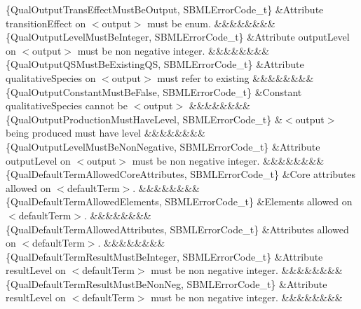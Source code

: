 \begin{DoxyParagraph}{}
\begin{longtabu}
\{Qual\+Output\+Trans\+Effect\+Must\+Be\+Output, S\+B\+M\+L\+Error\+Code\+\_\+t\} &Attribute \textquotesingle{}transition\+Effect\textquotesingle{} on {\ttfamily $<$output$>$} must be enum. &&&&&&&&\\
\{Qual\+Output\+Level\+Must\+Be\+Integer, S\+B\+M\+L\+Error\+Code\+\_\+t\} &Attribute \textquotesingle{}output\+Level\textquotesingle{} on {\ttfamily $<$output$>$} must be non negative integer. &&&&&&&&\\
\{Qual\+Output\+Q\+S\+Must\+Be\+Existing\+QS, S\+B\+M\+L\+Error\+Code\+\_\+t\} &Attribute \textquotesingle{}qualitative\+Species\textquotesingle{} on {\ttfamily $<$output$>$} must refer to existing &&&&&&&&\\
\{Qual\+Output\+Constant\+Must\+Be\+False, S\+B\+M\+L\+Error\+Code\+\_\+t\} &Constant \textquotesingle{}qualitative\+Species\textquotesingle{} cannot be {\ttfamily $<$output$>$} &&&&&&&&\\
\{Qual\+Output\+Production\+Must\+Have\+Level, S\+B\+M\+L\+Error\+Code\+\_\+t\} &{\ttfamily $<$output$>$} being produced must have level &&&&&&&&\\
\{Qual\+Output\+Level\+Must\+Be\+Non\+Negative, S\+B\+M\+L\+Error\+Code\+\_\+t\} &Attribute \textquotesingle{}output\+Level\textquotesingle{} on {\ttfamily $<$output$>$} must be non negative integer. &&&&&&&&\\
\{Qual\+Default\+Term\+Allowed\+Core\+Attributes, S\+B\+M\+L\+Error\+Code\+\_\+t\} &Core attributes allowed on {\ttfamily $<$default\+Term$>$}. &&&&&&&&\\
\{Qual\+Default\+Term\+Allowed\+Elements, S\+B\+M\+L\+Error\+Code\+\_\+t\} &Elements allowed on {\ttfamily $<$default\+Term$>$}. &&&&&&&&\\
\{Qual\+Default\+Term\+Allowed\+Attributes, S\+B\+M\+L\+Error\+Code\+\_\+t\} &Attributes allowed on {\ttfamily $<$default\+Term$>$}. &&&&&&&&\\
\{Qual\+Default\+Term\+Result\+Must\+Be\+Integer, S\+B\+M\+L\+Error\+Code\+\_\+t\} &Attribute \textquotesingle{}result\+Level\textquotesingle{} on {\ttfamily $<$default\+Term$>$} must be non negative integer. &&&&&&&&\\
\{Qual\+Default\+Term\+Result\+Must\+Be\+Non\+Neg, S\+B\+M\+L\+Error\+Code\+\_\+t\} &Attribute \textquotesingle{}result\+Level\textquotesingle{} on {\ttfamily $<$default\+Term$>$} must be non negative integer. &&&&&&&&\\

\end{longtabu}
\end{DoxyParagraph}
